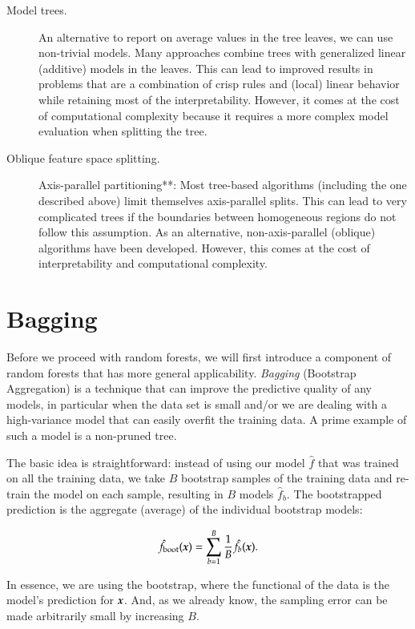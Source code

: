 \begin{description}
\item[Model trees.] An alternative to report on average values in the tree leaves, we can use non-trivial models. Many approaches combine trees with generalized linear (additive) models in the leaves. This can lead to improved results in problems that are a combination of crisp rules and (local) linear behavior while retaining most of the interpretability. However, it comes at the cost of computational complexity because it requires a more complex model evaluation when splitting the tree.

\item[Oblique feature space splitting.] Axis-parallel partitioning**: Most tree-based algorithms (including the one described above) limit themselves axis-parallel splits. This can lead to very complicated trees if the boundaries between homogeneous regions do not follow this assumption. As an alternative, non-axis-parallel (oblique) algorithms have been developed. However, this comes at the cost of interpretability and computational complexity.
\end{description}

\section{Bagging}

Before we proceed with random forests, we will first introduce a component of random forests that has more general applicability. {\em Bagging} (Bootstrap Aggregation) is a technique that can improve the predictive quality of any models, in particular when the data set is small and/or we are dealing with a high-variance model that can easily overfit the training data. A prime example of such a model is a non-pruned tree.

The basic idea is straightforward: instead of using our model $\hat{f}$ that was trained on all the training data, we take $B$ bootstrap samples of the training data and re-train the model on each sample, resulting in $B$ models $\hat{f}_b$. The bootstrapped prediction is the aggregate (average) of the individual bootstrap models:

$$\hat{f}_{\text{boot}}(\boldsymbol{x}) = \sum_{b=1}^B {1\over B} \hat{f}_b(\boldsymbol{x}).$$

In essence, we are using the bootstrap, where the functional of the data is the model's prediction for $\boldsymbol{x}$. And, as we already know, the sampling error can be made arbitrarily small by increasing $B$.

